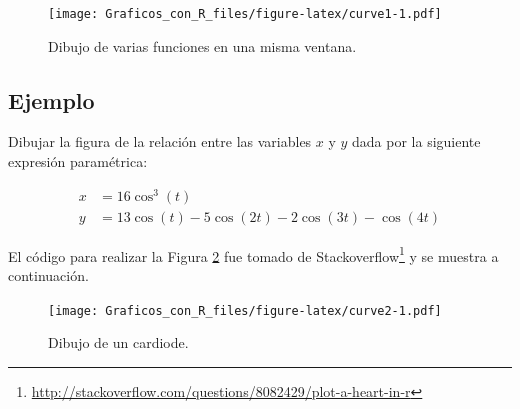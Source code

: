 \documentclass[10pt,]{krantz}
\makeatletter
\newenvironment{Shaded}{\begin{snugshade}}{\end{snugshade}}
\newcommand{\KeywordTok}[1]{\textcolor[rgb]{0.13,0.29,0.53}{\textbf{{#1}}}}
\newcommand{\DataTypeTok}[1]{\textcolor[rgb]{0.13,0.29,0.53}{{#1}}}
\newcommand{\DecValTok}[1]{\textcolor[rgb]{0.00,0.00,0.81}{{#1}}}
\newcommand{\FloatTok}[1]{\textcolor[rgb]{0.00,0.00,0.81}{{#1}}}
\newcommand{\StringTok}[1]{\textcolor[rgb]{0.31,0.60,0.02}{{#1}}}
\newcommand{\NormalTok}[1]{{#1}}
\renewcommand{\href}[2]{#2\footnote{\url{#1}}}
\newenvironment{kframe}{%
\medskip{}
\setlength{\fboxsep}{.8em}
 \def\at@end@of@kframe{}%
 \ifinner\ifhmode%
  \def\at@end@of@kframe{\end{minipage}}%
  \begin{minipage}{\columnwidth}%
 \fi\fi%
 \def\FrameCommand##1{\hskip\@totalleftmargin \hskip-\fboxsep
 \colorbox{shadecolor}{##1}\hskip-\fboxsep
     \hskip-\linewidth \hskip-\@totalleftmargin \hskip\columnwidth}%
 \MakeFramed {\advance\hsize-\width
   \@totalleftmargin\z@ \linewidth\hsize
   \@setminipage}}%
 {\par\unskip\endMakeFramed%
 \at@end@of@kframe}
\renewenvironment{Shaded}{\begin{kframe}}{\end{kframe}}
\makeatother
\begin{document}
\begin{figure}[htbp]
\centering
\texttt{[image: Graficos\_con\_R\_files/figure-latex/curve1-1.pdf]}
\caption{\label{fig:curve1}Dibujo de varias funciones en una misma ventana.}
\end{figure}

\subsection*{Ejemplo}\label{ejemplo-33}


Dibujar la figura de la relación entre las variables \(x\) y \(y\) dada
por la siguiente expresión paramétrica:

\begin{align}
x &= 16 \cos^3(t) \\
y &= 13 \cos(t)-5 \cos(2t)-2 \cos(3t)- \cos(4t)
\end{align}

El código para realizar la Figura \ref{fig:curve2} fue tomado de
\href{http://stackoverflow.com/questions/8082429/plot-a-heart-in-r}{Stackoverflow}
y se muestra a continuación.

\begin{Shaded}
\end{Shaded}

\begin{figure}[htbp]
\centering
\texttt{[image: Graficos\_con\_R\_files/figure-latex/curve2-1.pdf]}
\caption{\label{fig:curve2}Dibujo de un cardiode.}
\end{figure}
\end{document}
